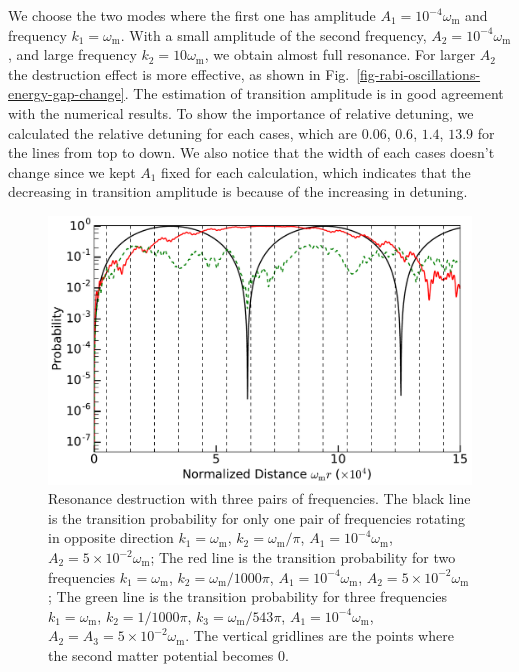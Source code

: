 \documentclass[%
reprint,
 amsmath,amssymb,
 prd,
]{revtex4-1}
\begin{document}
We choose the two modes where the first one has amplitude $A_1 = 10^{-4}\omega_{\mathrm{m}}$ and frequency $k_1 = \omega_{\mathrm{m}}$. With a small amplitude of the second frequency, $A_2=10^{-4}\omega_{\mathrm{m}}$, and large frequency $k_2=10\omega_{\mathrm{m}}$, we obtain almost full resonance. For larger $A_2$ the destruction effect is more effective, as shown in Fig.~\ref{fig-rabi-oscillations-energy-gap-change}. The estimation of transition amplitude is in good agreement with the numerical results. To show the importance of relative detuning, we calculated the relative detuning for each cases, which are $0.06$, $0.6$, $1.4$, $13.9$ for the lines from top to down. We also notice that the width of each cases doesn't change since we kept $A_1$ fixed for each calculation, which indicates that the decreasing in transition amplitude is because of the increasing in detuning.



\begin{figure}
    \includegraphics[width=\columnwidth]{assets/interference-reduction-three-modes-rabi}
    \caption{Resonance destruction with three pairs of frequencies. The black line is the transition probability for only one pair of frequencies rotating in opposite direction $k_1=\omega_{\mathrm m}$, $k_2=\omega_{\mathrm m}/\pi$, $A_1=10^{-4}\omega_{\mathrm m}$, $A_2 = 5\times 10^{-2}\omega_{\mathrm m}$; The red line is the transition probability for two frequencies $k_1=\omega_{\mathrm m}$, $k_2=\omega_{\mathrm m}/1000 \pi$, $A_1=10^{-4}\omega_{\mathrm m}$, $A_2 = 5\times 10^{-2}\omega_{\mathrm m}$; The green line is the transition probability for three frequencies $k_1=\omega_{\mathrm m}$, $k_2=1/1000\pi$, $k_3=\omega_{\mathrm m}/543\pi$, $A_1=10^{-4}\omega_{\mathrm m}$, $A_2 =A_3 = 5\times10^{-2}\omega_{\mathrm m}$. The vertical gridlines are the points where the second matter potential becomes 0.}
    \label{fig-interference-reduction-three-modes-rabi}
\end{figure}
\end{document}
